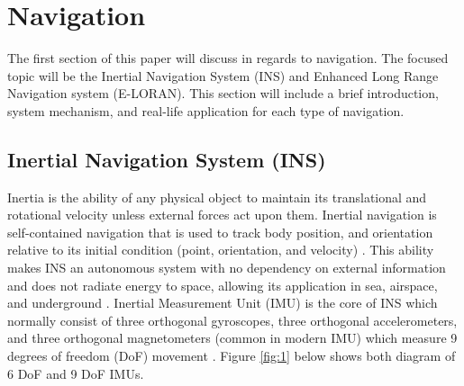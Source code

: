 \newpage
\setcounter{page}{1}
\justifying
\noindent

\section{Navigation}
The first section of this paper will discuss in regards to navigation. The focused topic will be the Inertial Navigation System (INS) and Enhanced Long Range Navigation system (E-LORAN). This section will include a brief introduction, system mechanism, and real-life application for each type of navigation.

\subsection{Inertial Navigation System (INS)}
Inertia is the ability of any physical object to maintain its translational and rotational velocity unless external forces act upon them. Inertial navigation is self-contained navigation that is used to track body position, and orientation relative to its initial condition (point, orientation, and velocity) \cite{Woodman2007NumberNavigation}\cite{Ribbens2003AircraftInstruments}. This ability makes INS an autonomous system with no dependency on external information and does not radiate energy to space, allowing its application in sea, airspace, and underground \cite{2018MiniatureUnit}. Inertial Measurement Unit (IMU) is the core of INS which normally consist of three orthogonal gyroscopes, three orthogonal accelerometers, and three orthogonal magnetometers (common in modern IMU) which measure 9 degrees of freedom (DoF) movement \cite{Christ2014NavigationalSensors}. Figure \ref{fig:1} below shows both diagram of 6 DoF and 9 DoF IMUs.\\

